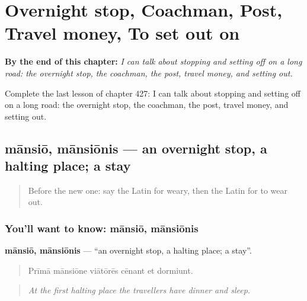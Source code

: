 
\chapter{Overnight stop, Coachman, Post, Travel money, To set out on}
\label{ch:la-overnight-stop-coachman-post-travel-money-to-set-out-on}

\begin{chapteropening}
\textbf{By the end of this chapter:} \emph{I can talk about stopping and setting off on a long road: the overnight stop, the coachman, the post, travel money, and setting out.}

Complete the last lesson of chapter 427: I can talk about stopping and setting off on a long road: the overnight stop, the coachman, the post, travel money, and setting out.
\end{chapteropening}

\section[mānsiō, mānsiōnis]{mānsiō, mānsiōnis — an overnight stop, a halting place; a stay}

\label{lesson:LA-C427-mansio}



\begin{quote}
Before the new one: say the Latin for weary, then the Latin for to wear out.
\end{quote}

\subsection*{You'll want to know: mānsiō, mānsiōnis}
\textbf{mānsiō, mānsiōnis} — \textquotedblleft{}an overnight stop, a halting place; a stay\textquotedblright{}.

\begin{quote}
Prīmā mānsiōne viātōrēs cēnant et dormiunt.
\end{quote}

\begin{quote}
\emph{At the first halting place the travellers have dinner and sleep.}
\end{quote}

